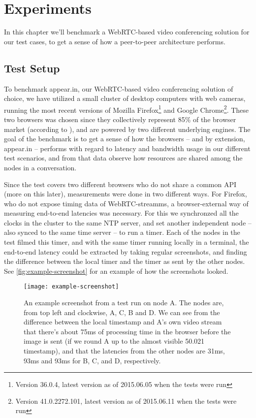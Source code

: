 \chapter{Experiments}\label{chp:experiments}

In this chapter we'll benchmark a WebRTC-based video conferencing solution for our test cases, to get a sense of how a peer-to-peer architecture performs.


\section{Test Setup}

To benchmark appear.in, our WebRTC-based video conferencing solution of choice, we have utilized a small cluster of desktop computers with web cameras, running the most recent versions of Mozilla Firefox\footnote{Version 36.0.4, latest version as of 2015.06.05 when the tests were run} and Google Chrome\footnote{Version 41.0.2272.101, latest version as of 2015.06.11 when the tests were run}. These two browsers was chosen since they collectively represent 85\% of the browser market (according to \cite{browser-stats}), and are powered by two different underlying engines. The goal of the benchmark is to get a sense of how the browsers -- and by extension, appear.in -- performs with regard to latency and bandwidth usage in our different test scenarios, and from that data observe how resources are shared among the nodes in a conversation.

Since the test covers two different browsers who do not share a common API (more on this later), measurements were done in two different ways. For Firefox, who do not expose timing data of WebRTC-streamms, a browser-external way of measuring end-to-end latencies was necessary. For this we synchronzed all the clocks in the cluster to the same \gls{NTP} server, and set another independent node -- also synced to the same time server -- to run a timer. Each of the nodes in the test filmed this timer, and with the same timer running locally in a terminal, the end-to-end latency could be extracted by taking regular screenshots, and finding the difference between the local timer and the timer as sent by the other nodes. See \autoref{fig:example-screenshot} for an example of how the screenshots looked.

\begin{figure}
    \centering
    \texttt{[image: example-screenshot]}
    \caption{An example screenshot from a test run on node A. The nodes are, from top left and clockwise, A, C, B and D. We can see from the difference between the local timestamp and A's own video stream that there's about 75ms of processing time in the browser before the image is sent (if we round A up to the almost visible 50.021 timestamp), and that the latencies from the other nodes are 31ms, 93ms and 93ms for B, C, and D, respectively.}
    \label{fig:example-screenshot}
\end{figure}

